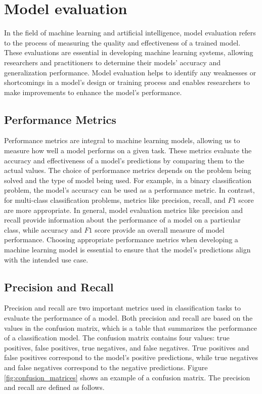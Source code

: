 \section{Model evaluation}
    In the field of machine learning and artificial intelligence, model evaluation refers to the process of measuring the quality and effectiveness of a trained model. These evaluations are essential in developing machine learning systems, allowing researchers and practitioners to determine their models' accuracy and generalization performance. Model evaluation helps to identify any weaknesses or shortcomings in a model's design or training process and enables researchers to make improvements to enhance the model's performance.

    \subsection*{Performance Metrics}
    Performance metrics are integral to machine learning models, allowing us to measure how well a model performs on a given task. These metrics evaluate the accuracy and effectiveness of a model's predictions by comparing them to the actual values. The choice of performance metrics depends on the problem being solved and the type of model being used. For example, in a binary classification problem, the model's accuracy can be used as a performance metric. In contrast, for multi-class classification problems, metrics like precision, recall, and $F1$ score are more appropriate. In general, model evaluation metrics like precision and recall provide information about the performance of a model on a particular class, while accuracy and $F1$ score provide an overall measure of model performance. Choosing appropriate performance metrics when developing a machine learning model is essential to ensure that the model's predictions align with the intended use case.
    
    \subsection{Precision and Recall}
    Precision and recall are two important metrics used in classification tasks to evaluate the performance of a model. 
    Both precision and recall are based on the values in the confusion matrix, which is a table that summarizes the performance of a classification model. The confusion matrix contains four values: true positives, false positives, true negatives, and false negatives. True positives and false positives correspond to the model's positive predictions, while true negatives and false negatives correspond to the negative predictions. Figure \ref{fig:confusion_matrices} shows an example of a confusion matrix. The precision and recall are defined as follows.
        

